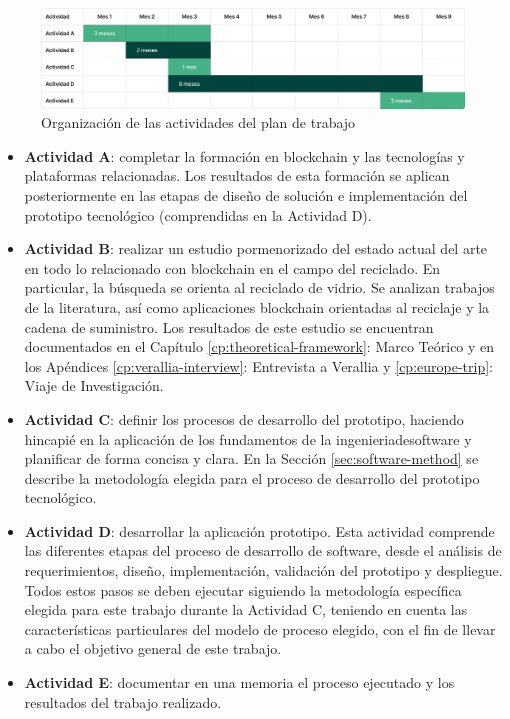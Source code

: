 \begin{figure}[!htb]
    \centering
    \includegraphics[width=\textwidth]{Figures/activities-plan.png}
    \caption{Organización de las actividades del plan de trabajo}
    \label{fig:activities-plan}
\end{figure}

\begin{itemize}
	\item \textbf{Actividad A}: completar la formación en blockchain y las tecnologías y plataformas relacionadas. Los resultados de esta formación se aplican posteriormente en las etapas de diseño de solución e implementación del prototipo tecnológico (comprendidas en la Actividad D).
	\item \textbf{Actividad B}: realizar un estudio pormenorizado del estado actual del arte en todo lo relacionado con blockchain en el campo del reciclado. En particular, la búsqueda se orienta al reciclado de vidrio. Se analizan trabajos de la literatura, así como aplicaciones blockchain orientadas al reciclaje y la cadena de suministro. Los resultados de este estudio se encuentran documentados en el Capítulo \ref{cp:theoretical-framework}: Marco Teórico y en los Apéndices \ref{cp:verallia-interview}: Entrevista a Verallia y \ref{cp:europe-trip}: Viaje de Investigación.
	\item \textbf{Actividad C}: definir los procesos de desarrollo del prototipo, haciendo hincapié en la aplicación de los fundamentos de la \gls{ingenieriadesoftware} y planificar de forma concisa y clara. En la Sección \ref{sec:software-method} se describe la metodología elegida para el proceso de desarrollo del prototipo tecnológico.
	\item \textbf{Actividad D}: desarrollar la aplicación prototipo. Esta actividad comprende las diferentes etapas del proceso de desarrollo de \gls{software}, desde el análisis de requerimientos, diseño, implementación, validación del prototipo y despliegue. Todos estos pasos se deben ejecutar siguiendo la metodología específica elegida para este trabajo durante la Actividad C, teniendo en cuenta las características particulares del modelo de proceso elegido, con el fin de llevar a cabo el objetivo general de este trabajo.
	\item \textbf{Actividad E}: documentar en una memoria el proceso ejecutado y los resultados del trabajo realizado.
\end{itemize}

